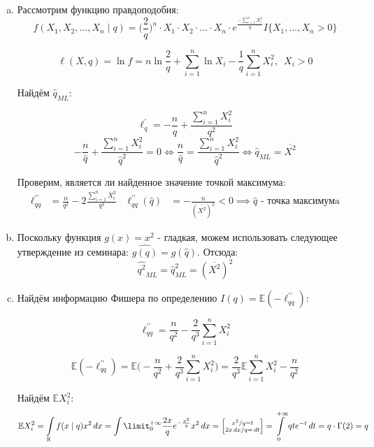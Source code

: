 \documentclass[12pt,letterpaper]{article}
\begin{document}
\begin{enumerate} [a)]
    \item
    {
        Рассмотрим функцию правдоподобия:
        $$f(X_1,X_2,...,X_n \mid q) = \Big(\frac{2}{q}\Big)^n \cdot X_1 \cdot X_2 \cdot ... \cdot X_n \cdot e^{\frac{-\sum\limits_{i=1}^{n}X_i^2}{q}} I\{X_1,...,X_n > 0\}$$
        
        $$\ell(X, q) = \ln{f} = n\ln{\frac{2}{q}} + \sum\limits_{i=1}^{n}\ln{X_i} - \frac{1}{q}\sum\limits_{i=1}^{n}X_i^2, \,\,\, X_i > 0$$
        
        Найдём $\hat{q}_{ML}$:
    
        $$\ell^{\prime}_{q} = -\frac{n}{q} + \frac{\sum\limits_{i=1}^{n}X_i^2}{q^2}$$
        $$-\frac{n}{\hat{q}} + \frac{\sum\limits_{i=1}^{n}X_i^2}{\hat{q}^2} = 0 \iff \frac{n}{\hat{q}} = \frac{\sum\limits_{i=1}^{n}X_i^2}{\hat{q}^2} \iff \hat{q}_{ML} = \overline{X^2}$$
        
        Проверим, является ли найденное значение точкой максимума:
        \begin{align*}
            \ell^{\prime\prime}_{qq} &= \frac{n}{q^2} -                2\frac{\sum\limits_{i=1}^{n}X_i^2}{q^3} &
            \ell^{\prime\prime}_{qq}(\hat{q}) &= -\frac{n}{(\overline{X^2})^2} < 0 \implies \hat{q} \text{ - точка максимумa}    
        \end{align*}
        
    }
    \item
    {
        Поскольку функция $g(x) = x^2$ - гладкая, можем использовать следующее утверждение из семинара: $\widehat{g(q)} = g(\hat{q})$. Отсюда:
        $$\widehat{q^2}_{ML} = \hat{q}^2_{ML} = (\overline{X^2})^2$$
    }
    \item
    {
        Найдём информацию Фишера по определению $I(q) = \mathbb{E}(-\ell^{\prime\prime}_{qq})$:
        
        $$\ell^{\prime\prime}_{qq} = \frac{n}{q^2} - \frac{2}{q^3}\sum\limits_{i=1}^{n} X_i^2$$
        
        $$\mathbb{E}(-\ell^{\prime\prime}_{qq}) = \mathbb{E}\Big(-\frac{n}{q^2} + \frac{2}{q^3}\sum\limits_{i=1}^{n} X_i^2\Big) = \frac{2}{q^3}\mathbb{E}\sum\limits_{i=1}^{n} X_i^2 - \frac{n}{q^2}$$
        
        Найдём $\mathbb{E}X_i^2$:
        $$\mathbb{E}X_i^2 = \int\limits_{\mathbb{R}}f(x\mid q) x^2 \,dx = \int\limit_{0}^{+\infty} \frac{2x}{q}e^{-\frac{x^2}{q}} x^2 \,dx = \Big[\substack{x^2 / q = t \\ 2x \,dx/q = \,dt}\Big] = \int\limits_{0}^{+\infty}qte^{-t}\,dt = q \cdot \Gamma(2) = q$$
        
}
\end{enumerate}
\end{document}

